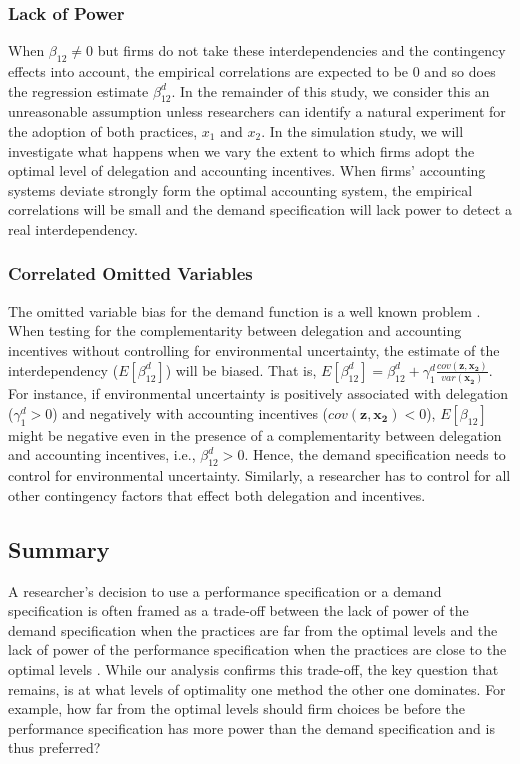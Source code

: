 \documentclass[12pt]{article}
\begin{document}
\subsubsection{Lack of Power}

When $\beta_{12} ≠ 0$ but firms do not take these interdependencies and the contingency effects into account, the empirical correlations are expected to be 0 and so does the regression estimate $\beta_{12}^d$. In the remainder of this study, we consider this an unreasonable assumption unless researchers can identify a natural experiment for the adoption of both practices, $x_1$ and $x_2$. In the simulation study, we will investigate what happens when we vary the extent to which firms adopt the optimal level of delegation and accounting incentives. When firms' accounting systems deviate strongly form the optimal accounting system, the empirical correlations will be small and the demand specification will lack power to detect a real interdependency.

\subsubsection{Correlated Omitted Variables}

The omitted variable bias for the demand function is a well known problem \citep{arora_testing_1996,grabner_management_2013,hofmann_organizational_2017}. When testing for the complementarity between delegation and accounting incentives without controlling for environmental uncertainty, the estimate of the interdependency ($E[\beta_{12}^d]$) will be biased. That is, $E[\beta_{12}^d]=\beta_{12}^d+\gamma_{1}^d \frac{cov(\mathbf{z}, \mathbf{x_2})}{var(\mathbf{x_2})}$. For instance, if environmental uncertainty is positively associated with delegation ($\gamma_{1}^d>0$) and negatively with accounting incentives ($cov(\mathbf{z}, \mathbf{x_2})<0$), $E[\beta_{12}]$ might be negative even in the presence of a complementarity between delegation and accounting incentives, i.e., $\beta_{12}^d>0$. Hence, the demand specification needs to control for environmental uncertainty. Similarly, a researcher has to control for all other contingency factors that effect both delegation and incentives.

\subsection{Summary}

A researcher's decision to use a performance specification or a demand specification is often framed as a trade-off between the lack of power of the demand specification when the practices are far from the optimal levels and the lack of power of the performance specification when the practices are close to the optimal levels \citep{grabner_management_2013, aral_three-way_2012,johansson_testing_2018}. While our analysis confirms this trade-off, the key question that remains, is at what levels of optimality one method the other one dominates. For example, how far from the optimal levels should firm choices be before the performance specification has more power than the demand specification and is thus preferred?
\end{document}
